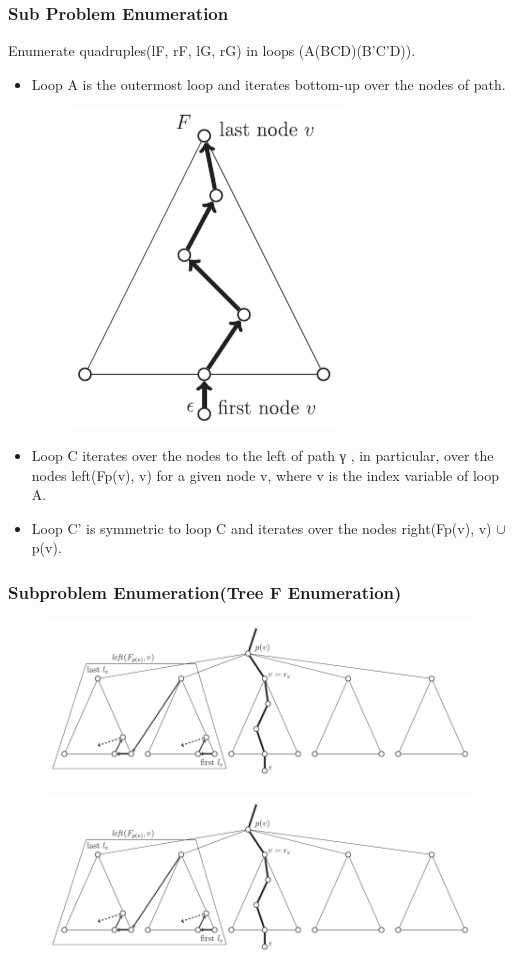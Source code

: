 \documentclass{beamer}
\begin{document}
\begin{frame}
\frametitle{Sub Problem Enumeration}
Enumerate quadruples(lF, rF, lG, rG) in loops (A(BCD)(B'C'D)).
\begin{itemize}
\item Loop A is the outermost loop and iterates bottom-up over the nodes of path.
\begin{figure}
	\includegraphics[width=0.2\linewidth]{Aloop}
	\label{Aloop} 
	\centering
\end{figure}
\item Loop C iterates over the nodes to the left of path γ , in particular, over the nodes
left(Fp(v), v) for a given node v, where v is the index variable of loop A.
\item Loop C' is symmetric to loop C and iterates over the nodes right(Fp(v), v) $\cup$ {p(v)}.
\end{itemize}
\end{frame}

\begin{frame}
\frametitle{Subproblem Enumeration(Tree F Enumeration)}
\begin{figure}
	\includegraphics[width=0.8\linewidth]{Cloop}
	\label{Cloop} 
	\centering
\end{figure}
\begin{figure}
	\includegraphics[width=0.8\linewidth]{Cloop}
	\label{C'loop} 
	\centering
\end{figure}
\end{frame}
\end{document}
